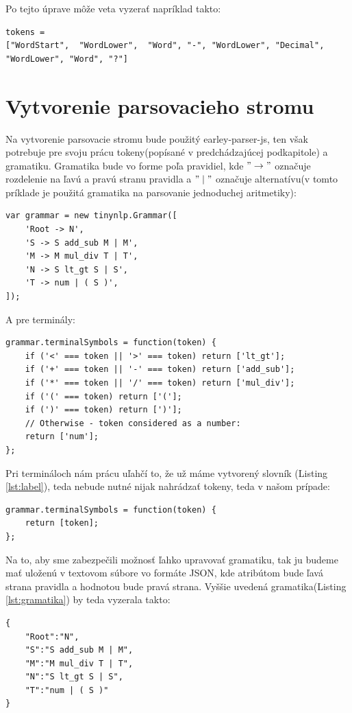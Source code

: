 \documentclass[12pt,a4paper]{report}
\theoremstyle{definition}
\theoremstyle{remark}
\begin{document}
\noindent Po tejto úprave môže veta vyzerať napríklad takto: \\
\begin{lstlisting}[caption={Tokeny po použití slovníku},style=htmlcssjs]
tokens = 
["WordStart",  "WordLower",  "Word", "-", "WordLower", "Decimal", "WordLower", "Word", "?"]
\end{lstlisting}

\section{Vytvorenie parsovacieho stromu}
Na vytvorenie parsovacie stromu bude použitý earley-parser-js, ten však potrebuje pre svoju prácu tokeny(popísané v predchádzajúcej podkapitole) a gramatiku. Gramatika bude vo forme poľa pravidiel, kde $"\to"$ označuje rozdelenie na ľavú a pravú stranu pravidla a $"\mid"$ označuje alternatívu(v tomto príklade je použitá gramatika na parsovanie jednoduchej aritmetiky):

\begin{lstlisting}[caption={Ukážková gramatika},label={lst:gramatika},style=htmlcssjs]
var grammar = new tinynlp.Grammar([
    'Root -> N',
    'S -> S add_sub M | M',
    'M -> M mul_div T | T',
    'N -> S lt_gt S | S',
    'T -> num | ( S )',
]);
\end{lstlisting}

\bigskip A pre terminály: 

\begin{lstlisting}[caption={Vytvorenie pravidiel pre terminály}, style=htmlcssjs]
grammar.terminalSymbols = function(token) {
    if ('<' === token || '>' === token) return ['lt_gt'];
    if ('+' === token || '-' === token) return ['add_sub'];
    if ('*' === token || '/' === token) return ['mul_div'];
    if ('(' === token) return ['('];
    if (')' === token) return [')'];
    // Otherwise - token considered as a number:
    return ['num'];
};
\end{lstlisting}

\bigskip Pri termináloch nám prácu uľahčí to, že už máme vytvorený slovník (Listing \ref{lst:label}), teda nebude nutné nijak nahrádzať tokeny, teda v našom prípade: \\
\begin{lstlisting}[style=htmlcssjs]
grammar.terminalSymbols = function(token) {
    return [token];
};
\end{lstlisting}
\bigskip
Na to, aby sme zabezpečili možnosť ľahko upravovať gramatiku, tak ju budeme mať uloženú v textovom súbore vo formáte JSON, kde atribútom bude ľavá strana pravidla a hodnotou bude pravá strana. Vyššie uvedená gramatika(Listing \ref{lst:gramatika}) by teda vyzerala takto:
\newpage
\begin{lstlisting}[caption={Ukážková gramatika V JSON-e},label={lst:gramatikaJSON},style=htmlcssjs]
{
	"Root":"N",
	"S":"S add_sub M | M",
	"M":"M mul_div T | T",
	"N":"S lt_gt S | S",
	"T":"num | ( S )"
}
\end{lstlisting}
\end{document}
